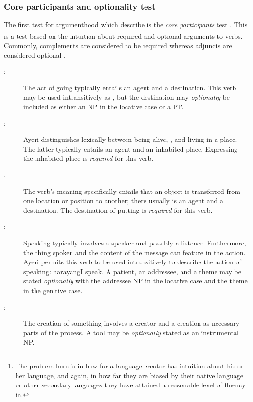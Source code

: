 \subsubsection{Core participants and optionality test}

The first test for argumenthood which \citet{needhamtoivonen2011} describe is
the \emph{core participants} test \citep[404]{needhamtoivonen2011}. This is a
test based on the intuition about required and optional arguments to
verbs.\footnote{The problem here is in how far a language creator has intuition
about his or her language, and again, in how far they are biased by their
native language or other secondary languages they have attained a reasonable
level of fluency in.} Commonly, complements are considered to be required
whereas adjuncts are considered optional \citep[405--407]{needhamtoivonen2011}.

\begin{description}
	\item[:] The act of going typically entails an
	agent and a destination. This verb may be used intransitively as
	, but the destination may \emph{optionally}
	be included as either an NP in the locative case or a PP.

	\item[:] Ayeri distinguishes
	lexically between being alive, , and living in a place.
	The latter typically entails an agent and an inhabited place. Expressing
	the inhabited place is \emph{required} for this verb.

	\item[:] The verb's meaning specifically
	entails that an object is transferred from one location or position to
	another; there usually is an agent and a destination. The destination of
	putting is \emph{required} for this verb.

	\item[:] Speaking typically involves
	a speaker and possibly a listener. Furthermore, the thing spoken and the
	content of the message can feature in the action. Ayeri permits this verb
	to be used intransitively to describe the action of speaking:
	 {narayāng}{I speak}. A patient, an addressee, and a theme
	may be stated \emph{optionally} with the addressee NP in the locative case
	and the theme in the genitive case.

	\item[:] The creation of something involves
	a creator and a creation as necessary parts of the process. A tool may be
	\emph{optionally} stated as an instrumental NP.
\end{description}

